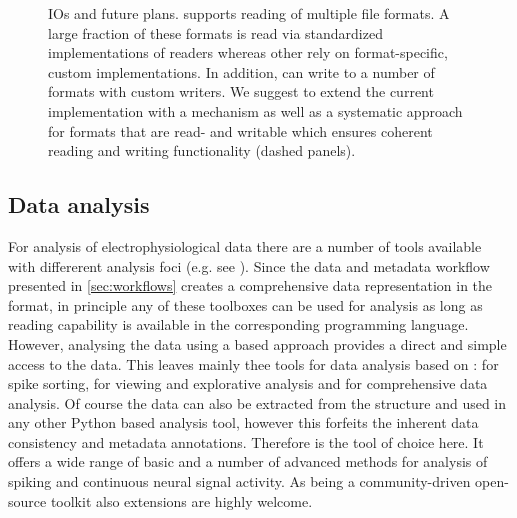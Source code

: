 \begin{figure}
 
 \caption[ IOs and future plans]{ IOs and future plans.  supports reading of multiple file formats. A large fraction of these formats is read via standardized implementations of readers whereas other rely on format-specific, custom implementations. In addition,  can write to a number of formats with custom writers. We suggest to extend the current implementation with a  mechanism as well as a systematic  approach for formats that are read- and writable which ensures coherent reading and writing functionality (dashed panels).}
 \label{fig:disc_neo_plans}
\end{figure}

\subsection{Data analysis}
For analysis of electrophysiological data there are a number of tools available with differerent analysis foci (e.g. see \citet{Unakafova_2019}). Since the data and metadata workflow presented in \ref{sec:workflows} creates a comprehensive data representation in the  format, in principle any of these toolboxes can be used for analysis as long as  reading capability is available in the corresponding programming language. However, analysing the data using a  based approach provides a direct and simple access to the data. This leaves mainly thee tools for data analysis based on :  for spike sorting,  for viewing and explorative analysis and  for comprehensive data analysis. Of course the data can also be extracted from the  structure and used in any other Python based analysis tool, however this forfeits the inherent data consistency and metadata annotations. Therefore  is the tool of choice here. It offers a wide range of basic and a number of advanced methods for analysis of spiking and continuous neural signal activity. As  being a community-driven open-source toolkit also extensions are highly welcome.

